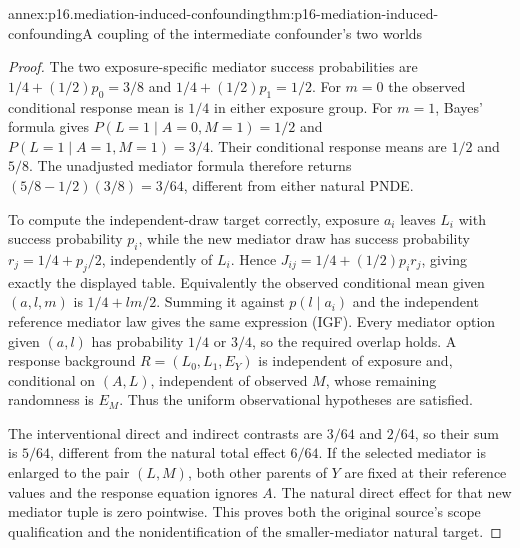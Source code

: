 \begin{annexitem}{annex:p16.mediation-induced-confounding}{thm:p16-mediation-induced-confounding}{A coupling of the intermediate confounder's two worlds}
\begin{proof}
The two exposure-specific mediator success probabilities are
\(1/4+(1/2)p_0=3/8\) and \(1/4+(1/2)p_1=1/2\).
For \(m=0\) the observed conditional response mean is \(1/4\)
in either exposure group. For \(m=1\), Bayes' formula gives
\(P(L=1\mid A=0,M=1)=1/2\) and
\(P(L=1\mid A=1,M=1)=3/4\). Their conditional response means
are \(1/2\) and \(5/8\). The unadjusted mediator formula therefore
returns \((5/8-1/2)(3/8)=3/64\), different from either natural PNDE.

To compute the independent-draw target correctly, exposure \(a_i\)
leaves \(L_i\) with success probability \(p_i\), while the new mediator
draw has success probability \(r_j=1/4+p_j/2\), independently of
\(L_i\). Hence
\(J_{ij}=1/4+(1/2)p_i r_j\), giving exactly the displayed table.
Equivalently the observed conditional mean given \((a,l,m)\) is
\(1/4+lm/2\). Summing it against \(p(l\mid a_i)\) and the independent
reference mediator law gives the same expression (IGF). Every mediator
option given \((a,l)\) has probability \(1/4\) or \(3/4\), so the
required overlap holds. A response background \(R=(L_0,L_1,E_Y)\)
is independent of exposure and, conditional on \((A,L)\), independent
of observed \(M\), whose remaining randomness is \(E_M\). Thus the
uniform observational hypotheses are satisfied.

The interventional direct and indirect contrasts are \(3/64\) and
\(2/64\), so their sum is \(5/64\), different from the natural
total effect \(6/64\). If the selected mediator is enlarged to the
pair \((L,M)\), both other parents of \(Y\) are fixed at their
reference values and the response equation ignores \(A\). The natural
direct effect for that new mediator tuple is zero pointwise. This
proves both the original source's scope qualification and the
nonidentification of the smaller-mediator natural target.
\end{proof}
\end{annexitem}

